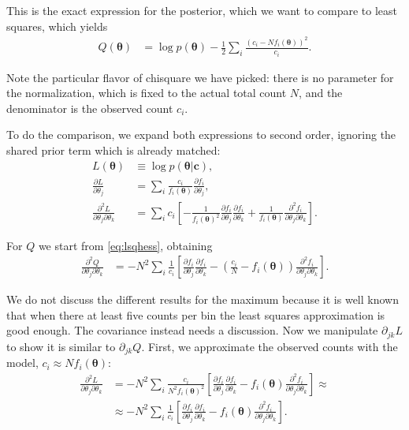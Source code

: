 This is the exact expression for the posterior, which we want to compare to
least squares, which yields
%
\begin{align}
    Q(\boldsymbol\theta) &=
    \log p(\boldsymbol\theta)
    -\frac 12
    \sum_i \frac {(c_i - N f_i(\boldsymbol\theta))^2} {c_i}.
\end{align}

Note the particular flavor of chisquare we have picked: there is no parameter
for the normalization, which is fixed to the actual total count $N$, and the
denominator is the observed count $c_i$.

To do the comparison, we expand both expressions to second order, ignoring the
shared prior term which is already matched:
%
\begin{align}
    L(\boldsymbol\theta) &\equiv \log p(\boldsymbol\theta|\mathbf c), \\
    \frac {\partial L} {\partial\theta_j} &=
    \sum_i \frac {c_i} {f_i(\boldsymbol\theta)}
    \frac {\partial f_i} {\partial \theta_j}, \\
    \frac {\partial^2 L} {\partial\theta_j \partial\theta_k} &=
    \sum_i c_i \left[
    -\frac 1 {f_i(\boldsymbol\theta)^2}
    \frac {\partial f_i} {\partial \theta_j}
    \frac {\partial f_i} {\partial \theta_k}
    + \frac 1 {f_i(\boldsymbol\theta)}
    \frac {\partial^2 f_i} {\partial\theta_j \partial\theta_k}
    \right].
\end{align}

For $Q$ we start from \eqref{eq:lsqhess}, obtaining
%
\begin{align}
    \frac {\partial^2 Q} {\partial\theta_j \partial\theta_k} &=
    -N^2 \sum_i
    \frac 1 {c_i} \left[
    \frac {\partial f_i} {\partial \theta_j}
    \frac {\partial f_i} {\partial \theta_k}
    - \left( \frac{c_i} N - f_i(\boldsymbol\theta) \right)
    \frac {\partial^2 f_i} {\partial\theta_j \partial\theta_k}
    \right]. \label{eq:Qjk}
\end{align}

We do not discuss the different results for the maximum because it is well
known that when there at least five counts per bin the least squares
approximation is good enough. The covariance instead needs a discussion. Now we
manipulate $\partial_{jk} L$ to show it is similar to $\partial_{jk} Q$. First,
we approximate the observed counts with the model, $c_i \approx N
f_i(\boldsymbol\theta)$:
%
\begin{align}
    \frac {\partial^2 L} {\partial\theta_j \partial\theta_k} &=
    -N^2 \sum_i \frac {c_i} {N^2 f_i(\boldsymbol\theta)^2} \left[
    \frac {\partial f_i} {\partial \theta_j}
    \frac {\partial f_i} {\partial \theta_k}
    - f_i(\boldsymbol\theta)
    \frac {\partial^2 f_i} {\partial\theta_j \partial\theta_k}
    \right] \approx \\
    &\approx
    -N^2 \sum_i \frac 1 {c_i} \left[
    \frac {\partial f_i} {\partial \theta_j}
    \frac {\partial f_i} {\partial \theta_k}
    - f_i(\boldsymbol\theta)
    \frac {\partial^2 f_i} {\partial\theta_j \partial\theta_k}
    \right].
\end{align}

